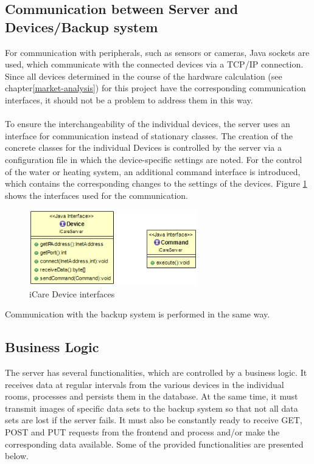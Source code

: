 \subsection{Communication between Server and Devices/Backup system}
For communication with peripherals, such as sensors or cameras, Java sockets are used, which communicate with the connected devices via a TCP/IP connection. Since all devices determined in the course of the hardware calculation (see chapter\ref{market-analysis}) for this project have the corresponding communication interfaces, it should not be a problem to address them in this way.
\\\\
To ensure the interchangeability of the individual devices, the server uses an interface for communication instead of stationary classes. The creation of the concrete classes for the individual Devices is controlled by the server via a configuration file in which the device-specific settings are noted. For the control of the water or heating system, an additional command interface is introduced, which contains the corresponding changes to the settings of the devices. Figure \ref{icare-interfaces} shows the interfaces used for the communication.
\begin{figure}[H]
	\centering
	\includegraphics[width =0.65\textwidth]{images/devices.png}
	\caption{iCare Device interfaces}
	\label{icare-interfaces}
\end{figure}
Communication with the backup system is performed in the same way.
\subsection{Business Logic}
The server has several functionalities, which are controlled by a business logic. It receives data at regular intervals from the various devices in the individual rooms, processes and persists them in the database. At the same time, it must transmit images of specific data sets to the backup system so that not all data sets are lost if the server fails. It must also be constantly ready to receive GET, POST and PUT requests from the frontend and process and/or make the corresponding data available. Some of the provided functionalities are presented below.
